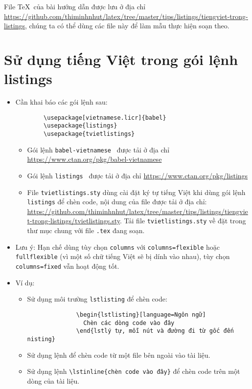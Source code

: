 \documentclass[12pt,a4paper]{article}
\begin{document}
File \TeX\ của bài hướng dẫn được lưu ở địa chỉ \url{https://github.com/thiminhnhut/latex/tree/master/tips/listings/tiengviet-trong-listings}, chúng ta có thể dùng các file này để làm mẫu thực hiện soạn theo.

\section{Sử dụng tiếng Việt trong gói lệnh listings}
\begin{itemize}
  \item Cần khai báo các gói lệnh sau:
        \begin{verbatim}
        \usepackage[vietnamese.licr]{babel}
        \usepackage{listings}
        \usepackage{tvietlistings}
      \end{verbatim}
        \begin{itemize}
          \item Gói lệnh \verb|babel-vietnamese|~\cite{vietnamese-ctan} được tải ở địa chỉ \url{https://www.ctan.org/pkg/babel-vietnamese}

          \item Gói lệnh \verb|listings|~\cite{listings-ctan} được tải ở địa chỉ \url{https://www.ctan.org/pkg/listings}

          \item File \verb|tvietlistings.sty| dùng cài đặt ký tự tiếng Việt khi dùng gói lệnh \verb|listings| để chèn code, nội dung của file được tải ở địa chỉ: \url{https://github.com/thiminhnhut/latex/tree/master/tips/listings/tiengviet-trong-listings/tvietlistings.sty}. Tải file \verb|tvietlistings.sty| về đặt trong thư mục chung với file \verb|.tex| đang soạn.
        \end{itemize}

  \item Lưu ý: Hạn chế dùng tùy chọn \verb|columns| với \verb|columns=flexible| hoặc \verb|fullflexible| (vì một số chữ tiếng Việt sẽ bị dính vào nhau), tùy chọn \verb|columns=fixed| vẫn hoạt động tốt.
  \item Ví dụ:
        \begin{itemize}
          \item Sử dụng môi trường \verb|lstlisting| để chèn code:
                \begin{verbatim}
              \begin{lstlisting}[language=Ngôn ngữ]
                Chèn các dòng code vào đây
              \end{lstlý tự, mỗi nút và đường đi từ gốc đến nisting}
            \end{verbatim}
          \item Sử dụng lệnh \verb|| để chèn code từ một file bên ngoài vào tài liệu.

          \item Sử dụng lệnh \verb|\lstinline{chèn code vào đây}| để chèn code trên một dòng của tài liệu.
        \end{itemize}
\end{itemize}
\end{document}
